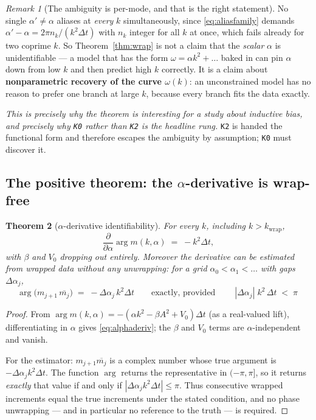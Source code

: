 \documentclass[11pt,a4paper]{article}
\theoremstyle{plain}
\newtheorem{theorem}{Theorem}[section]
\theoremstyle{definition}
\theoremstyle{remark}
\newtheorem{remark}[theorem]{Remark}
\newcommand{\dt}{\Delta t}
\newcommand{\kwrap}{k_{\mathrm{wrap}}}
\newcommand{\code}[1]{\texttt{\small #1}}
\begin{document}
\begin{remark}[The ambiguity is per-mode, and that is the right statement]
\label{rem:permode}
No single $\alpha' \ne \alpha$ aliases at \emph{every} $k$ simultaneously, since
\eqref{eq:aliasfamily} demands $\alpha'-\alpha = 2\pi n_k/(k^2\dt)$ with $n_k$ integer for
all $k$ at once, which fails already for two coprime $k$. So Theorem~\ref{thm:wrap} is
not a claim that the \emph{scalar} $\alpha$ is unidentifiable --- a model that has the
form $\omega = \alpha k^2 + \dots$ baked in can pin $\alpha$ down from low $k$ and then
predict high $k$ correctly. It is a claim about \textbf{nonparametric recovery of the
curve $\omega(k)$}: an unconstrained model has no reason to prefer one branch at large
$k$, because every branch fits the data exactly.

\emph{This is precisely why the theorem is interesting for a study about inductive bias,
and precisely why \code{K0} rather than \code{K2} is the headline rung.} \code{K2} is
handed the functional form and therefore escapes the ambiguity by assumption; \code{K0}
must discover it.
\end{remark}

\subsection{The positive theorem: the $\alpha$-derivative is wrap-free}
\label{sec:alphaderiv}

\begin{theorem}[$\alpha$-derivative identifiability]
\label{thm:alphaderiv}
For every $k$, including $k>\kwrap$,
\begin{equation}
\label{eq:alphaderiv}
\frac{\partial}{\partial\alpha}\arg m(k,\alpha) \;=\; -k^2\dt ,
\end{equation}
with $\beta$ and $V_0$ dropping out entirely. Moreover the derivative can be estimated
from \emph{wrapped} data without any unwrapping: for a grid $\alpha_0<\alpha_1<\dots$ with
gaps $\Delta\alpha_j$,
\[
\arg\bigl(m_{j+1}\,\overline{m_j}\bigr) \;=\; -\Delta\alpha_j\,k^2\dt
\qquad\text{exactly, provided}\qquad
\boxed{\;|\Delta\alpha_j|\;k^2\,\dt \;<\;\pi\;}
\]
\end{theorem}

\begin{proof}
From $\arg m(k,\alpha) = -(\alpha k^2 - \beta A^2 + V_0)\dt$ (as a real-valued lift),
differentiating in $\alpha$ gives \eqref{eq:alphaderiv}; the $\beta$ and $V_0$ terms are
$\alpha$-independent and vanish.

For the estimator: $m_{j+1}\overline{m_j}$ is a complex number whose true argument is
$-\Delta\alpha_j k^2\dt$. The function $\arg$ returns the representative in $(-\pi,\pi]$,
so it returns \emph{exactly} that value if and only if
$|\Delta\alpha_j k^2\dt| \le \pi$. Thus consecutive wrapped increments equal the true
increments under the stated condition, and no phase unwrapping --- and in particular no
reference to the truth --- is required.
\end{proof}
\end{document}
